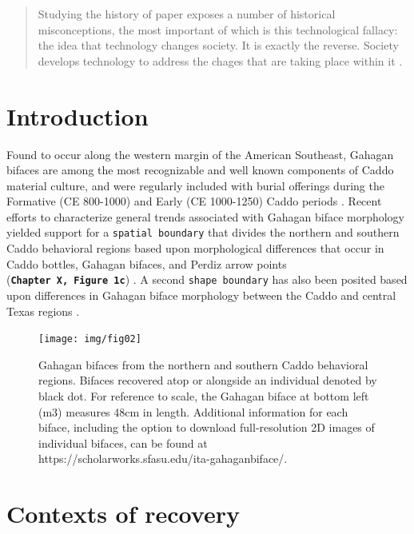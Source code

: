 \documentclass[]{interact}
\theoremstyle{plain}%
\theoremstyle{definition}
\theoremstyle{remark}
\begin{document}
\begin{quote}
Studying the history of paper exposes a number of historical
misconceptions, the most important of which is this technological
fallacy: the idea that technology changes society. It is exactly the
reverse. Society develops technology to address the chages that are
taking place within it \citep[xiv]{RN10878}.
\end{quote}

\hypertarget{introduction}{%
\section{Introduction}\label{introduction}}

Found to occur along the western margin of the American Southeast,
Gahagan bifaces are among the most recognizable and well known
components of Caddo material culture, and were regularly included with
burial offerings during the Formative (CE 800-1000) and Early (CE
1000-1250) Caddo periods
\citep{RN7115,RN8189,RN5746,RN8186,RN8174,RN8176}. Recent efforts to
characterize general trends associated with Gahagan biface morphology
yielded support for a \texttt{spatial\ boundary} that divides the
northern and southern Caddo behavioral regions based upon morphological
differences that occur in Caddo bottles, Gahagan bifaces, and Perdiz
arrow points (\textbf{\texttt{Chapter\ X,\ Figure\ 1c}})
\citep{RN7925,RN8071,RN8361,RN8967,RN11064,RN8154}. A second
\texttt{shape\ boundary} has also been posited based upon differences in
Gahagan biface morphology between the Caddo and central Texas regions
\citep{RN8318}.

\begin{figure}

{\centering \texttt{[image: img/fig02]} 

}

\caption{Gahagan bifaces from the northern and southern Caddo behavioral regions. Bifaces recovered atop or alongside an individual denoted by black dot. For reference to scale, the Gahagan biface at bottom left (m3) measures 48cm in length. Additional information for each biface, including the option to download full-resolution 2D images of individual bifaces, can be found at https://scholarworks.sfasu.edu/ita-gahaganbiface/.}\label{fig:gahagan bifaces 2D}
\end{figure}

\hypertarget{contexts-of-recovery}{%
\section{Contexts of recovery}\label{contexts-of-recovery}}
\end{document}
